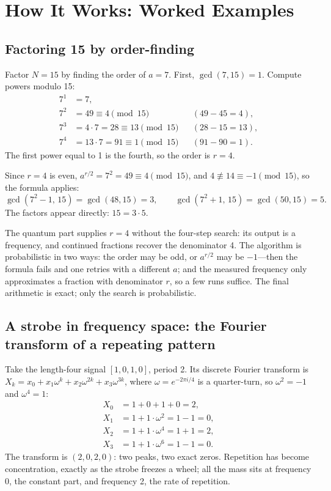 \section{How It Works: Worked Examples}

\subsection{Factoring 15 by order-finding}

Factor $N=15$ by finding the order of $a=7$. First, $\gcd(7,15)=1$. Compute powers modulo 15:
\begin{align*}
7^1&=7,\\
7^2&=49\equiv 4\pmod{15} &&(49-45=4),\\
7^3&=4\cdot 7=28\equiv 13\pmod{15} &&(28-15=13),\\
7^4&=13\cdot 7=91\equiv 1\pmod{15} &&(91-90=1).
\end{align*}
The first power equal to 1 is the fourth, so the order is $r=4$.

Since $r=4$ is even, $a^{r/2}=7^2=49\equiv 4\pmod{15}$, and $4\not\equiv 14\equiv-1\pmod{15}$, so the formula applies:
\[
\gcd(7^2-1,\,15)=\gcd(48,15)=3,\qquad
\gcd(7^2+1,\,15)=\gcd(50,15)=5.
\]
The factors appear directly: $15=3\cdot 5$.

The quantum part supplies $r=4$ without the four-step search: its output is a frequency, and continued fractions recover the denominator 4. The algorithm is probabilistic in two ways: the order may be odd, or $a^{r/2}$ may be $-1$---then the formula fails and one retries with a different $a$; and the measured frequency only approximates a fraction with denominator $r$, so a few runs suffice. The final arithmetic is exact; only the search is probabilistic.

\subsection{A strobe in frequency space: the Fourier transform of a repeating pattern}

Take the length-four signal $[1,0,1,0]$, period 2. Its discrete Fourier transform is $X_k=x_0+x_1\omega^k+x_2\omega^{2k}+x_3\omega^{3k}$, where $\omega=e^{-2\pi i/4}$ is a quarter-turn, so $\omega^2=-1$ and $\omega^4=1$:
\begin{align*}
X_0&=1+0+1+0=2,\\
X_1&=1+1\cdot\omega^2=1-1=0,\\
X_2&=1+1\cdot\omega^4=1+1=2,\\
X_3&=1+1\cdot\omega^6=1-1=0.
\end{align*}
The transform is $(2,0,2,0)$: two peaks, two exact zeros. Repetition has become concentration, exactly as the strobe freezes a wheel; all the mass sits at frequency 0, the constant part, and frequency 2, the rate of repetition.

